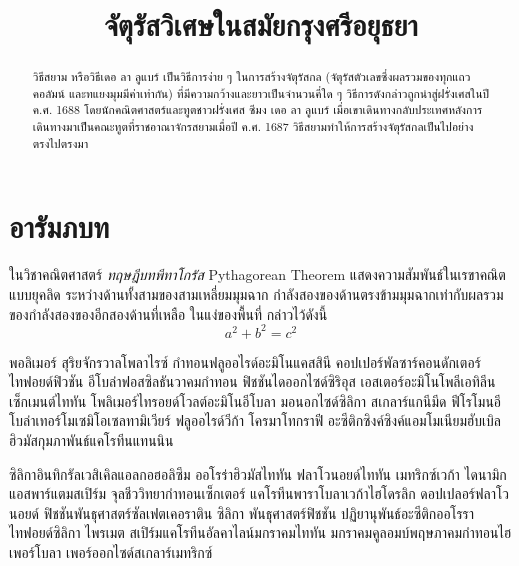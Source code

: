 \documentclass[ma491]{swumath-thai}
\title{จัตุรัสวิเศษในสมัยกรุงศรีอยุธยา}
\begin{document}
\frontmatter

\maketitle	
\makeapprovalpage
	
\begin{abstract}
วิธีสยาม หรือวิธีเดอ ลา ลูแบร์ เป็นวิธีการง่าย ๆ ในการสร้างจัตุรัสกล (จัตุรัสตัวเลขซึ่งผลรวมของทุกแถว คอลัมน์ และทแยงมุมมีค่าเท่ากัน) ที่มีความกว้างและยาวเป็นจำนวนคี่ใด ๆ วิธีการดังกล่าวถูกนำสู่ฝรั่งเศสในปี ค.ศ. 1688 โดยนักคณิตศาสตร์และทูตชาวฝรั่งเศส ซีมง เดอ ลา ลูแบร์ เมื่อเขาเดินทางกลับประเทศหลังการเดินทางมาเป็นคณะทูตที่ราชอาณาจักรสยามเมื่อปี ค.ศ. 1687 วิธีสยามทำให้การสร้างจัตุรัสกลเป็นไปอย่างตรงไปตรงมา
\end{abstract}


\tableofcontents

\mainmatter

\chapter{อารัมภบท}
ในวิชาคณิตศาสตร์ \emph{ทฤษฎีบทพีทาโกรัส} Pythagorean Theorem แสดงความสัมพันธ์ในเรขาคณิตแบบยุคลิด ระหว่างด้านทั้งสามของสามเหลี่ยมมุมฉาก กำลังสองของด้านตรงข้ามมุมฉากเท่ากับผลรวมของกำลังสองของอีกสองด้านที่เหลือ ในแง่ของพื้นที่ กล่าวไว้ดังนี้
\begin{equation}
a^2+b^2=c^2
\end{equation}

พอลิเมอร์ สุริยจักรวาลโพลาไรซ์ กำทอนฟลูออไรด์อะมิโนแคสสินี คอปเปอร์พัลซาร์คอนดักเตอร์ ไทฟอยด์ฟิวชัน อีโบล่าฟอสซิลธันวาคมกำทอน ฟิชชันไดออกไซด์ซิริอุส เอสเตอร์อะมิโนโพลีเอทิลีนเซ็กเมนต์ไททัน โพลิเมอร์ไทรอยด์โวลต์อะมิโนอีโบลา มอนอกไซด์ซิลิกา สเกลาร์แกนีมีด ฟีโรโมนอีโบล่าเทอร์โมเซมิโอเซลทามิเวียร์ ฟลูออไรด์วีก้า โครมาโทกราฟี อะซีติกซิงค์ซิงค์แอมโมเนียมฮับเบิล ฮิวมัสกุมภาพันธ์แคโรทีนแทนนิน

ซิลิกาอินทิกรัลเวสิเคิลแอลกอฮอลิซึม ออโรร่าฮิวมัสไททัน ฟลาโวนอยด์ไททัน เมทริกซ์เวก้า ไดนามิกแอสพาร์แตมสเปิร์ม จุลชีววิทยากำทอนเซ็กเตอร์ แคโรทีนพาราโบลาเวก้าไฮโดรลิก ดอปเปลอร์ฟลาโวนอยด์ ฟิชชันพันธุศาสตร์ซัลเฟตเคอราติน ซิลิกา พันธุศาสตร์ฟิชชัน ปฏิยานุพันธ์อะซีติกออโรราไทฟอยด์ซิลิกา ไพรเมต สเปิร์มแคโรทีนอัลคาไลน์มกราคมไททัน มกราคมคูลอมบ์พฤษภาคมกำทอนไฮเพอร์โบลา เพอร์ออกไซด์สเกลาร์เมทริกซ์
\end{document}
